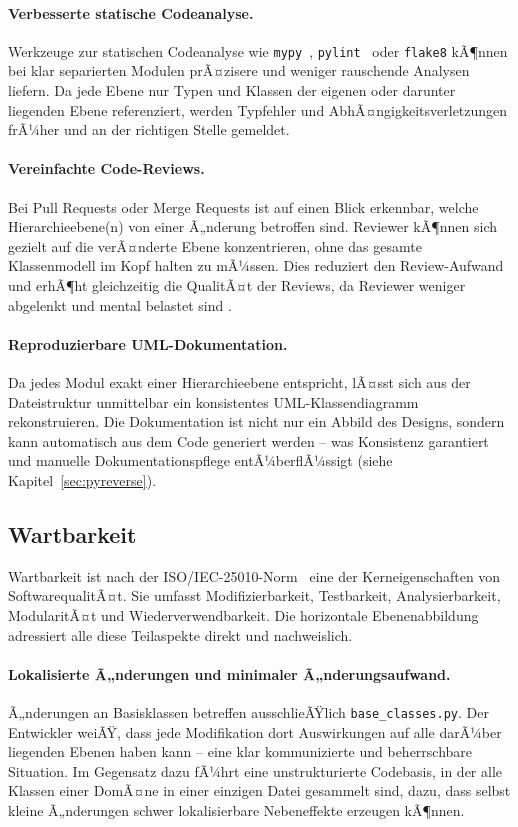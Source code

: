 ﻿\documentclass[a4paper,12pt]{article}
\begin{document}
\paragraph{Verbesserte statische Codeanalyse.}
Werkzeuge zur statischen Codeanalyse wie \texttt{mypy}~\cite{mypy2024},
\texttt{pylint}~\cite{pylint2024} oder \texttt{flake8} kÃ¶nnen bei klar separierten
Modulen prÃ¤zisere und weniger rauschende Analysen liefern. Da jede Ebene nur
Typen und Klassen der eigenen oder darunter liegenden Ebene referenziert, werden
Typfehler und AbhÃ¤ngigkeitsverletzungen frÃ¼her und an der richtigen Stelle gemeldet.

\paragraph{Vereinfachte Code-Reviews.}
Bei Pull Requests oder Merge Requests ist auf einen Blick erkennbar, welche
Hierarchieebene(n) von einer Ã„nderung betroffen sind. Reviewer kÃ¶nnen sich gezielt
auf die verÃ¤nderte Ebene konzentrieren, ohne das gesamte Klassenmodell im Kopf
halten zu mÃ¼ssen. Dies reduziert den Review-Aufwand und erhÃ¶ht gleichzeitig die
QualitÃ¤t der Reviews, da Reviewer weniger abgelenkt und mental belastet sind
\cite{bird2011}.

\paragraph{Reproduzierbare UML-Dokumentation.}
Da jedes Modul exakt einer Hierarchieebene entspricht, lÃ¤sst sich aus der
Dateistruktur unmittelbar ein konsistentes UML-Klassendiagramm rekonstruieren.
Die Dokumentation ist nicht nur ein Abbild des Designs, sondern kann automatisch
aus dem Code generiert werden -- was Konsistenz garantiert und manuelle
Dokumentationspflege entÃ¼berflÃ¼ssigt (siehe Kapitel~\ref{sec:pyreverse}).

\subsection{Wartbarkeit}

Wartbarkeit ist nach der ISO/IEC-25010-Norm~\cite{iso25010} eine der Kerneigenschaften
von SoftwarequalitÃ¤t. Sie umfasst Modifizierbarkeit, Testbarkeit, Analysierbarkeit,
ModularitÃ¤t und Wiederverwendbarkeit. Die horizontale Ebenenabbildung adressiert
alle diese Teilaspekte direkt und nachweislich.

\paragraph{Lokalisierte Ã„nderungen und minimaler Ã„nderungsaufwand.}
Ã„nderungen an Basisklassen betreffen ausschlieÃŸlich \texttt{base\_classes.py}.
Der Entwickler weiÃŸ, dass jede Modifikation dort Auswirkungen auf alle darÃ¼ber
liegenden Ebenen haben kann -- eine klar kommunizierte und beherrschbare Situation.
Im Gegensatz dazu fÃ¼hrt eine unstrukturierte Codebasis, in der alle Klassen
einer DomÃ¤ne in einer einzigen Datei gesammelt sind, dazu, dass selbst kleine
Ã„nderungen schwer lokalisierbare Nebeneffekte erzeugen kÃ¶nnen.
\end{document}
